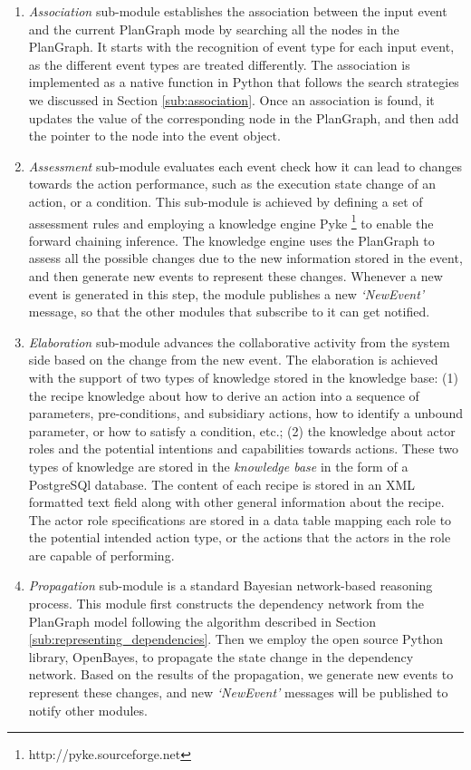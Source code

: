 \begin{enumerate}
	\item \emph{Association} sub-module establishes the association between the input event and the current PlanGraph mode by searching all the nodes in the PlanGraph. It starts with the recognition of event type for each input event, as the different event types are treated differently. The association is implemented as a native function in Python that follows the search strategies we discussed in Section \ref{sub:association}. Once an association is found, it updates the value of the corresponding node in the PlanGraph, and then add the pointer to the node into the event object.
	\item \emph{Assessment} sub-module evaluates each event check how it can lead to changes towards the action performance, such as the execution state change of an action, or a condition. This sub-module is achieved by defining a set of assessment rules and employing a knowledge engine Pyke \footnote{http://pyke.sourceforge.net} to enable the forward chaining inference. The knowledge engine uses the PlanGraph to assess all the possible changes due to the new information stored in the event, and then generate new events to represent these changes. Whenever a new event is generated in this step, the module publishes a new \emph{`NewEvent'} message, so that the other modules that subscribe to it can get notified.
	\item \emph{Elaboration} sub-module advances the collaborative activity from the system side based on the change from the new event. The elaboration is achieved with the support of two types of knowledge stored in the knowledge base: (1) the recipe knowledge about how to derive an action into a sequence of parameters, pre-conditions, and subsidiary actions, how to identify a unbound parameter, or how to satisfy a condition, etc.; (2) the knowledge about actor roles and the potential intentions and capabilities towards actions. These two types of knowledge are stored in the \emph{knowledge base} in the form of a PostgreSQl database. The content of each recipe is stored in an XML formatted text field along with other general information about the recipe. The actor role specifications are stored in a data table mapping each role to the potential intended action type, or the actions that the actors in the role are capable of performing.
	\item \emph{Propagation} sub-module is a standard Bayesian network-based reasoning process. This module first constructs the dependency network from the PlanGraph model following the algorithm described in Section \ref{sub:representing_dependencies}. Then we employ the open source Python library, OpenBayes, to propagate the state change in the dependency network. Based on the results of the propagation, we generate new events to represent these changes, and new \emph{`NewEvent'} messages will be published to notify other modules.
\end{enumerate}

